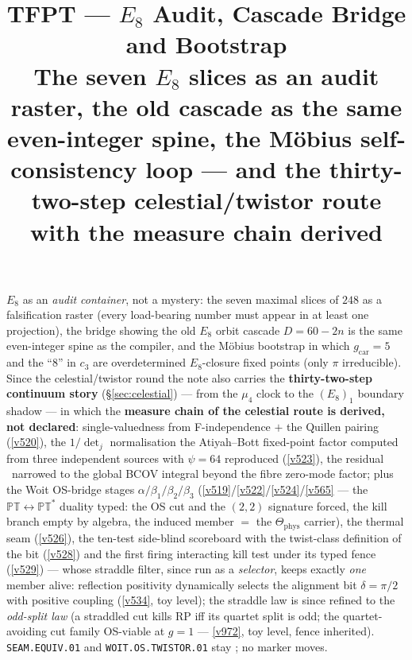 \documentclass[11pt,a4paper]{article}
\title{\vspace{-1.2cm}\textbf{TFPT --- $E_8$ Audit, Cascade Bridge and Bootstrap}\\[2mm]\large The seven $E_8$ slices as an audit raster, the old cascade as the same even-integer spine, the M\"obius self-consistency loop --- and the thirty-two-step celestial/twistor route with the measure chain derived}
\author{\TFPTauthors}\date{\TFPTdatestamp}
\theoremstyle{definition}
\begin{document}
\maketitle
\vspace{-0.4cm}

\begin{keybox}
$E_8$ as an \emph{audit container}, not a mystery: the seven maximal slices of $248$ as a falsification
raster (every load-bearing number must appear in at least one projection), the bridge showing the old
$E_8$ orbit cascade $D{=}60{-}2n$ is the same even-integer spine as the compiler, and the M\"obius bootstrap
in which $g_{\mathrm{car}}=5$ and the ``$8$'' in $c_3$ are overdetermined $E_8$-closure fixed points (only
$\pi$ irreducible). Since the celestial/twistor round the note also carries the
\textbf{thirty-two-step continuum story} (\S\ref{sec:celestial}) --- from the $\mu_4$ clock to the
$(E_8)_1$ boundary shadow --- in which the \textbf{measure chain of the celestial route is
derived, not declared}: single-valuedness from F-independence $+$ the Quillen pairing
(\vref{v520}), the $1/\det_j$ normalisation the Atiyah--Bott fixed-point factor computed from
three independent sources with $\psi=64$ reproduced (\vref{v523}), the residual \mO\ narrowed to
the global BCOV integral beyond the fibre zero-mode factor; plus the Woit OS-bridge stages
$\alpha/\beta_1/\beta_2/\beta_3$ (\vref{v519}/\vref{v522}/\vref{v524}/\vref{v565} --- the
$\mathbb{PT}\leftrightarrow\mathbb{PT}^*$ duality typed: the OS cut and the $(2,2)$ signature
forced, the kill branch empty by algebra, the induced member $=$ the
$\Theta_{\mathrm{phys}}$ carrier), the thermal seam
(\vref{v526}), the ten-test side-blind scoreboard with the twist-class definition of the bit
(\vref{v528}) and the first firing interacting kill test under its typed fence (\vref{v529}) ---
whose straddle filter, since run as a \emph{selector}, keeps exactly \emph{one} member alive:
reflection positivity dynamically selects the alignment bit $\delta=\pi/2$ with positive coupling
(\vref{v534}, toy level); the straddle law is since refined to the \emph{odd-split law} (a
straddled cut kills RP iff its quartet split is odd; the quartet-avoiding cut family OS-viable
at $g=1$ --- \vref{v972}, toy level, fence inherited).
\texttt{SEAM.EQUIV.01} and \texttt{WOIT.OS.TWISTOR.01} stay \mO; no marker moves.
\end{keybox}
\end{document}
